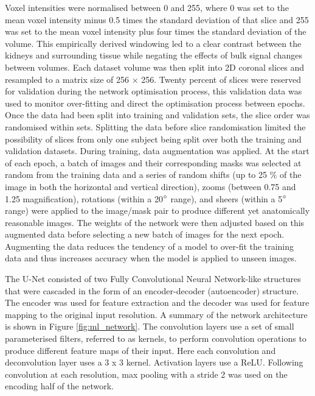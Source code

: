 Voxel intensities were normalised between 0 and 255, where 0 was set to the mean voxel intensity minus 0.5 times the standard deviation of that slice and 255 was set to the mean voxel intensity plus four times the standard deviation of the volume. This empirically derived windowing led to a clear contrast between the kidneys and surrounding tissue while negating the effects of bulk signal changes between volumes. Each dataset volume was then split into 2D coronal slices and resampled to a matrix size of 256 $\times$ 256. Twenty percent of slices were reserved for validation during the network optimisation process, this validation data was used to monitor over-fitting and direct the optimisation process between epochs. Once the data had been split into training and validation sets, the slice order was randomised within sets. Splitting the data before slice randomisation limited the possibility of slices from only one  subject being split over both the training and validation datasets. During training, data augmentation was applied. At the start of each epoch, a batch of images and their corresponding masks was selected at random from the training data and a series of random shifts (up to 25 \% of the image in both the horizontal and vertical direction), zooms (between 0.75 and 1.25 magnification), rotations (within a 20$\degree$ range), and sheers (within a 5$\degree$ range) were applied to the image/mask pair to produce different yet anatomically reasonable images. The weights of the network were then adjusted based on this augmented data before selecting a new batch of images for the next epoch. Augmenting the data reduces the tendency of a model to over-fit the training data and thus increases accuracy when the model is applied to unseen images. 

The U-Net consisted of two Fully Convolutional Neural Network-like structures that were cascaded in the form of an encoder-decoder (autoencoder) structure. The encoder was used for feature extraction and the decoder was used for feature mapping to the original input resolution. A summary of the network architecture is shown in Figure \ref{fig:ml_network}. The convolution layers use a set of small parameterised filters, referred to as kernels, to perform convolution operations to produce different feature maps of their input. Here each convolution and deconvolution layer uses a 3 x 3 kernel. Activation layers use a \ac{ReLU}. Following convolution at each resolution, max pooling with a stride 2 was used on the encoding half of the network.

